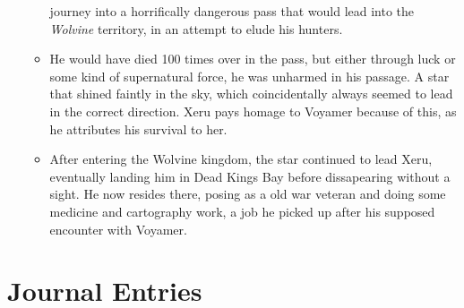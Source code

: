 \documentclass[12pt]{article}
\begin{document}
\begin{itemize}
\begin{itemize}
          journey into a horrifically dangerous pass that would lead into the
          \textit{Wolvine} territory, in an attempt to elude his hunters.
        \item He would have died 100 times over in the pass, but either through
          luck or some kind of supernatural force, he was unharmed in his
          passage. A star that shined faintly in the sky, which coincidentally
          always seemed to lead in the correct direction. Xeru pays homage to
          Voyamer because of this, as he attributes his survival to her.
        \item After entering the Wolvine kingdom, the star continued to lead
          Xeru, eventually landing him in Dead Kings Bay before dissapearing
          without a sight. He now resides there, posing as a old war veteran and
          doing some medicine and cartography work, a job he picked up after his
          supposed encounter with Voyamer.
      \end{itemize}
  \end{itemize}
\fi

\section{Journal Entries}


\clearpage

\end{document}
